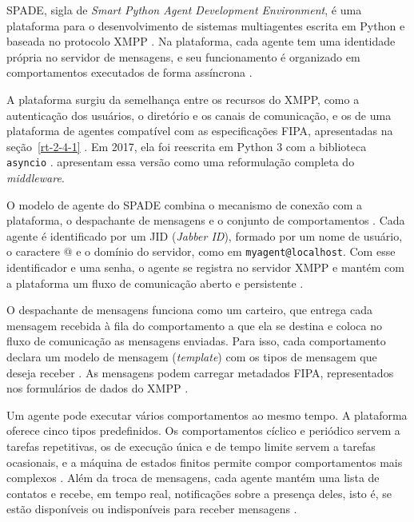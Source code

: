 SPADE, sigla de \textit{Smart Python Agent Development Environment}, é uma plataforma para o desenvolvimento de sistemas multiagentes escrita em Python e baseada no protocolo XMPP \cite{palanca2020,spadeDocs}. Na plataforma, cada agente tem uma identidade própria no servidor de mensagens, e seu funcionamento é organizado em comportamentos executados de forma assíncrona \cite{spadeDocs}.

A plataforma surgiu da semelhança entre os recursos do XMPP, como a autenticação dos usuários, o diretório e os canais de comunicação, e os de uma plataforma de agentes compatível com as especificações FIPA, apresentadas na seção~\ref{rt-2-4-1} \cite{spadeForeword}. Em 2017, ela foi reescrita em Python 3 com a biblioteca \texttt{asyncio} \cite{spadeForeword}.  apresentam essa versão como uma reformulação completa do \textit{middleware}.

O modelo de agente do SPADE combina o mecanismo de conexão com a plataforma, o despachante de mensagens e o conjunto de comportamentos \cite{palanca2020,spadeModel}. Cada agente é identificado por um JID (\textit{Jabber ID}), formado por um nome de usuário, o caractere @ e o domínio do servidor, como em \texttt{myagent@localhost}. Com esse identificador e uma senha, o agente se registra no servidor XMPP e mantém com a plataforma um fluxo de comunicação aberto e persistente \cite{spadeModel}.

O despachante de mensagens funciona como um carteiro, que entrega cada mensagem recebida à fila do comportamento a que ela se destina e coloca no fluxo de comunicação as mensagens enviadas. Para isso, cada comportamento declara um modelo de mensagem (\textit{template}) com os tipos de mensagem que deseja receber \cite{spadeModel}. As mensagens podem carregar metadados FIPA, representados nos formulários de dados do XMPP \cite{spadeDocs}.

Um agente pode executar vários comportamentos ao mesmo tempo. A plataforma oferece cinco tipos predefinidos. Os comportamentos cíclico e periódico servem a tarefas repetitivas, os de execução única e de tempo limite servem a tarefas ocasionais, e a máquina de estados finitos permite compor comportamentos mais complexos \cite{spadeModel}. Além da troca de mensagens, cada agente mantém uma lista de contatos e recebe, em tempo real, notificações sobre a presença deles, isto é, se estão disponíveis ou indisponíveis para receber mensagens \cite{spadePresence}.

